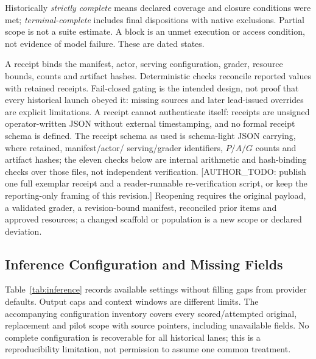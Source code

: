 \documentclass[a4paper,runningheads]{llncs}
\begin{document}
Historically \emph{strictly complete} means declared coverage and closure
conditions were met; \emph{terminal-complete} includes final dispositions with native
exclusions. Partial scope is not a suite estimate. A block is an unmet execution
or access condition, not evidence of model failure. These are dated states.

A receipt binds the manifest, actor, serving configuration, grader, resource
bounds, counts and artifact hashes. Deterministic checks reconcile reported
values with retained receipts. Fail-closed gating is the intended design, not
proof that every historical launch obeyed it: missing sources and later
lead-issued overrides are explicit limitations. A receipt cannot authenticate
itself: receipts are unsigned operator-written JSON without external
timestamping, and no formal receipt schema is defined. The receipt schema
as used is schema-light JSON carrying, where retained, manifest/actor/
serving/grader identifiers, $P/A/G$ counts and artifact hashes; the
eleven checks below are internal arithmetic and hash-binding checks over
those files, not independent verification. [AUTHOR\_TODO: publish one full
exemplar receipt and a reader-runnable re-verification script, or keep the
reporting-only framing of this revision.] Reopening requires the original payload, a validated grader, a
revision-bound manifest, reconciled prior items and approved resources; a
changed scaffold or population is a new scope or declared deviation.

\subsection{Inference Configuration and Missing Fields}
Table~\ref{tab:inference} records available settings without filling gaps from
provider defaults. Output caps and context windows are different limits.
The accompanying configuration inventory covers every scored/attempted original,
replacement and pilot scope with source pointers, including unavailable fields.
No complete configuration is recoverable for all historical lanes; this is a
reproducibility limitation, not permission to assume one common treatment.
\end{document}

